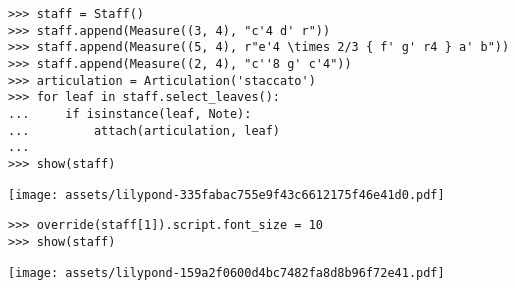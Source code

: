 \begin{comment}
<abjad>
staff = Staff()
staff.append(Measure((3, 4), "c'4 d' r"))
staff.append(Measure((5, 4), r"e'4 \times 2/3 { f' g' r4 } a' b"))
staff.append(Measure((2, 4), "c''8 g' c'4"))
articulation = Articulation('staccato')
for leaf in staff.select_leaves():
    if isinstance(leaf, Note):
        attach(articulation, leaf)

show(staff)
</abjad>
\end{comment}

\begin{abjadbookoutput}
\begin{singlespacing}
\vspace{-0.5\baselineskip}
\begin{lstlisting}
>>> staff = Staff()
>>> staff.append(Measure((3, 4), "c'4 d' r"))
>>> staff.append(Measure((5, 4), r"e'4 \times 2/3 { f' g' r4 } a' b"))
>>> staff.append(Measure((2, 4), "c''8 g' c'4"))
>>> articulation = Articulation('staccato')
>>> for leaf in staff.select_leaves():
...     if isinstance(leaf, Note):
...         attach(articulation, leaf)
...
>>> show(staff)
\end{lstlisting}
\noindent\texttt{[image: assets/lilypond-335fabac755e9f43c6612175f46e41d0.pdf]}
\end{singlespacing}
\end{abjadbookoutput}

\begin{comment}
<abjad>
override(staff[1]).script.font_size = 10
show(staff)
</abjad>
\end{comment}

\begin{abjadbookoutput}
\begin{singlespacing}
\vspace{-0.5\baselineskip}
\begin{lstlisting}
>>> override(staff[1]).script.font_size = 10
>>> show(staff)
\end{lstlisting}
\noindent\texttt{[image: assets/lilypond-159a2f0600d4bc7482fa8d8b96f72e41.pdf]}
\end{singlespacing}
\end{abjadbookoutput}

\begin{comment}
<abjad>
slur = spannertools.Slur(direction=Down)
attach(slur, staff.select_leaves()[1:-1])
override(slur).note_head.style = 'cross'
show(staff)
</abjad>
\end{comment}

